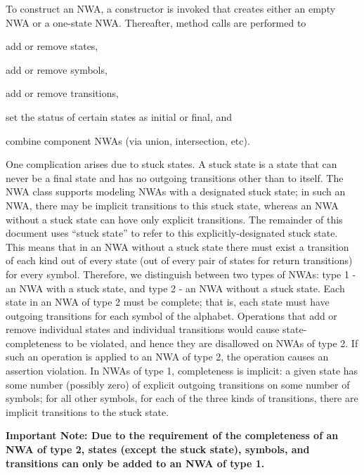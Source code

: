 \documentclass{llncs}
\begin{document}
To construct an NWA, a constructor is invoked that creates either an empty NWA or a one-state NWA.  Thereafter, method calls are performed to \begin{inparaenum} \item add or remove states, \item add or remove symbols, \item add or remove transitions, \item set the status of certain states as initial or final, and \item combine component NWAs (via union, intersection, etc). \end{inparaenum}


One complication arises due to stuck states.  A stuck state is a state that can never be a final state and has no outgoing transitions other than to itself.  The NWA class supports modeling NWAs with a designated stuck state; in such an NWA, there may be implicit transitions to this stuck state, whereas an NWA without a stuck state can hove only explicit transitions.  The remainder of this document uses ``stuck state'' to refer to this explicitly-designated stuck state.  This means that in an NWA without a stuck state there must exist a transition of each kind out of every state (out of every pair of states for return transitions) for every symbol.  Therefore, we distinguish between two types of NWAs: type 1 - an NWA with a stuck state, and type 2 - an NWA without a stuck state.  Each state in an NWA of type 2 must be complete; that is, each state must have outgoing transitions for each symbol of the alphabet.  Operations that add or remove individual states and individual transitions would cause state-completeness to be violated, and hence they are disallowed on NWAs of type 2.  If such an operation is applied to an NWA of type 2, the operation causes an assertion violation.  In NWAs of type 1, completeness is implicit: a given state has some number (possibly zero) of explicit outgoing transitions on some number of symbols; for all other symbols, for each of the three kinds of transitions, there are implicit transitions to the stuck state.  

\textbf{Important Note: Due to the requirement of the completeness of an NWA of type 2, states (except the stuck state), symbols, and transitions can only be added to an NWA of type 1.}  
\end{document}
